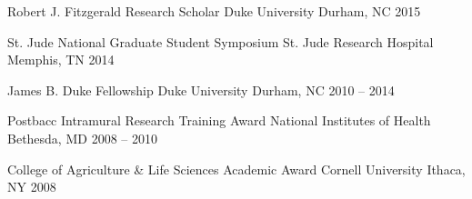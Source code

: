 

\begin{cvhonors}


  \cvhonor
    {Robert J. Fitzgerald Research Scholar} %
    {Duke University} %
    {Durham, NC} %
    {2015} %


  \cvhonor
    {St. Jude National Graduate Student Symposium} %
    {St. Jude Research Hospital} %
    {Memphis, TN} %
    {2014} %


  \cvhonor
    {James B. Duke Fellowship} %
    {Duke University} %
    {Durham, NC} %
    {2010 -- 2014} %


  \cvhonor
    {Postbacc Intramural Research Training Award} %
    {National Institutes of Health} %
    {Bethesda, MD} %
    {2008 -- 2010} %

  \cvhonor
    {College of Agriculture \& Life Sciences Academic Award}
    {Cornell University} %
    {Ithaca, NY} %
    {2008} %



\end{cvhonors}
